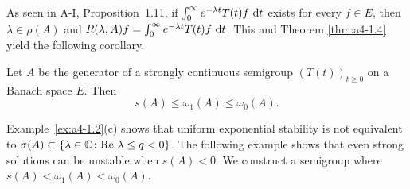 As seen in A-I, Proposition~1.11, if $\int_0^\infty e^{-\lambda t} T(t) f \,\mathop{}\!\mathrm{d}{t}$ exists for every $f \in E$, then $\lambda \in \rho(A)$ and $R(\lambda, A) f = \int_0^\infty e^{-\lambda t} T(t) f \,\mathop{}\!\mathrm{d}{t}$. 
This and Theorem \ref{thm:a4-1.4} yield the following corollary.
\begin{corollary} \label{cor:a4-1.5} Let $ A $ be the generator of a strongly continuous semigroup $ (T(t))_{t \geq 0} $ on a Banach space $ E $. 
Then  
\[
s(A) \leq \omega_1(A) \leq \omega_{0}(A).
\]
\end{corollary}
Example~\ref{ex:a4-1.2}(c) shows that uniform exponential stability is not equivalent to $ \sigma(A) \subset \{\lambda \in \mathbb{C}\colon\text{Re } \lambda \leq q < 0 \} $. 
The following example shows that even strong solutions can be unstable when $ s(A) < 0 $. We construct a semigroup where $ s(A) < \omega_1(A) < \omega_{0}(A) $.

